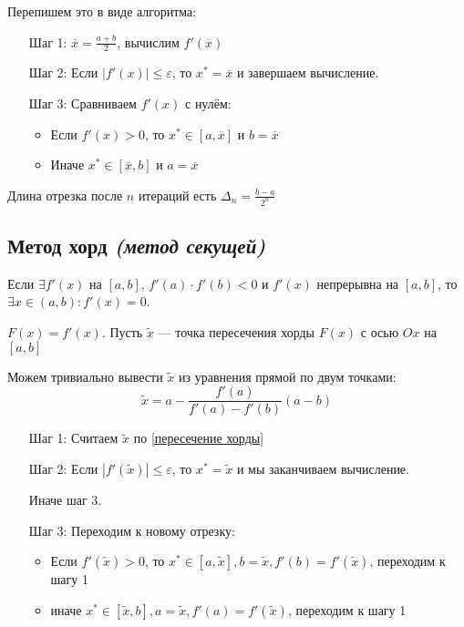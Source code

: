 Перепишем это в виде алгоритма:

\begin{itemize}
    \item [Шаг 1:] \(\overline x = \frac{a + b}{2}\), вычислим \(f'(\overline x)\)
    \item [Шаг 2:] Если \(|f'(x)| \leq \varepsilon\), то \(x^* = \overline x\) и завершаем вычисление.
    \item [Шаг 3:] Сравниваем \(f'(x)\) с нулём: \begin{itemize}
              \item Если \(f'(x) > 0\), то \(x^*\in[a, \overline x]\) и \(b = \overline x\)
              \item Иначе \(x^*\in[\overline x, b]\) и \(a = \overline x\)
          \end{itemize}
\end{itemize}

Длина отрезка после \(n\) итераций есть \(\Delta_n = \frac{b - a}{2^n}\)

\subsection{Метод хорд \textit{(метод секущей)}}

Если \(\exists f'(x)\) на \([a, b]\), \(f'(a) \cdot f'(b) < 0\) и \(f'(x)\) непрерывна на \([a, b]\), то \(\exists x\in(a, b) : f'(x) = 0\).

\(F(x) = f'(x)\). Пусть \(\tilde{x}\) --- точка пересечения хорды \(F(x)\) с осью \(Ox\) на \([a, b]\)

\begin{figure}[h]
    \centering
    
\end{figure}

Можем тривиально вывести \(\tilde{x}\) из уравнения прямой по двум точками:
\begin{equation}
    \tilde{x} = a - \frac{f'(a)}{f'(a) - f'(b)}(a - b) \label{пересечение хорды}
\end{equation}

\begin{itemize}
    \item [Шаг 1:] Считаем \(\tilde{x}\) по \eqref{пересечение хорды}
    \item [Шаг 2:] Если \(|f'(\tilde{x})| \leq \varepsilon\), то \(x^* = \tilde{x}\) и мы заканчиваем вычисление.

          Иначе шаг 3.
    \item [Шаг 3:] Переходим к новому отрезку:
          \begin{itemize}
              \item Если \(f'(\tilde{x}) > 0\), то \(x^* \in [a, \tilde{x}], b = \tilde{x}, f'(b) = f'(\tilde{x})\), переходим к шагу 1
              \item иначе \(x^* \in [\tilde{x}, b], a = \tilde{x}, f'(a) = f'(\tilde{x})\), переходим к шагу 1
          \end{itemize}
\end{itemize}

